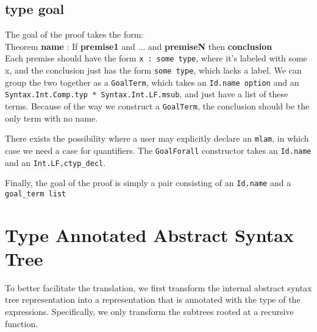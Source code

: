 \documentclass[11pt]{article}
\begin{document}
\subsection{type goal}
The goal of the proof takes the form:\\
Theorem \textbf{name} : If \textbf{premise1} and ... and \textbf{premiseN} then \textbf{conclusion}\\
Each premise should have the form \verb+x : some type+, where it's labeled with some x, and the conclusion just has the form \verb+some type+, which lacks a label. We can group the two together as a \verb+GoalTerm+, which takes an \verb+Id.name option+ and an \verb+Syntax.Int.Comp.typ * Syntax.Int.LF.msub+, and just have a list of these terms. Because of the way we construct a \verb+GoalTerm+, the conclusion should be the only term with no name.

There exists the possibility where a user may explicitly declare an \verb+mlam+, in which case we need a case for quantifiers. The \verb+GoalForall+ constructor takes an \verb+Id.name+ and an \verb+Int.LF.ctyp_decl+.

Finally, the goal of the proof is simply a pair consisting of an \verb+Id.name+ and a \verb+goal_term list+

\section{Type Annotated Abstract Syntax Tree}

To better facilitate the translation, we first transform the internal abstract syntax tree representation into a representation that is annotated with the type of the expressions. Specifically, we only transform the subtrees rooted at a recursive function.
\end{document}
